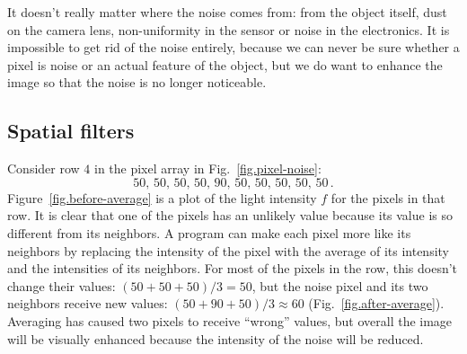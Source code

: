 
It doesn't really matter where the noise comes from: from the object itself, dust on the camera lens, non-uniformity in the sensor or noise in the electronics. It is impossible to get rid of the noise entirely, because we can never be sure whether a pixel is noise or an actual feature of the object, but we do want to enhance the image so that the noise is no longer noticeable.

\subsection{Spatial filters}

Consider row $4$ in the pixel array in Fig.~\ref{fig.pixel-noise}:
\[
50,\, 50,\, 50,\,50,\, 90,\, 50,\, 50,\, 50,\, 50,\, 50\,.
\]
Figure~\ref{fig.before-average} is a plot of the light intensity $f$ for the pixels in that row. It is clear that one of the pixels has an unlikely value because its value is so different from its neighbors. A program can make each pixel more like its neighbors by replacing the intensity of the pixel with the average of its intensity and the intensities of its neighbors. For most of the pixels in the row, this doesn't change their values: $(50+50+50)/3=50$, but the noise pixel and its two neighbors receive new values: $(50+90+50)/3\approx 60$ (Fig.~\ref{fig.after-average}). Averaging has caused two pixels to receive ``wrong'' values, but overall the image will be visually enhanced because the intensity of the noise will be reduced.

